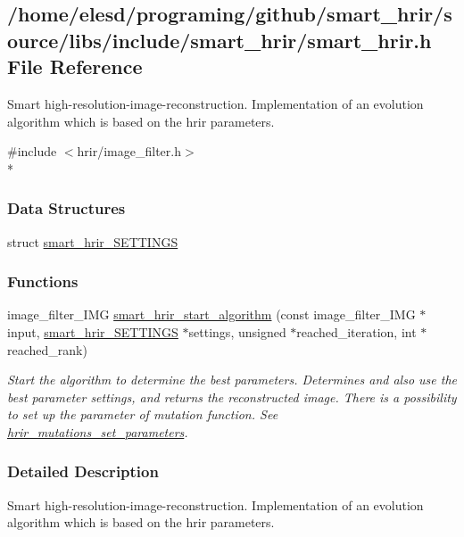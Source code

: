 \hypertarget{a00006}{\subsection{/home/elesd/programing/github/smart\-\_\-hrir/source/libs/include/smart\-\_\-hrir/smart\-\_\-hrir.h File Reference}
\label{a00006}
}


Smart high-\/resolution-\/image-\/reconstruction. Implementation of an evolution algorithm which is based on the hrir parameters.  


{\ttfamily \#include $<$hrir/image\-\_\-filter.\-h$>$}\\*
\subsubsection*{Data Structures}
\begin{DoxyCompactItemize}
\item 
struct \hyperlink{a00002}{smart\-\_\-hrir\-\_\-\-S\-E\-T\-T\-I\-N\-G\-S}
\end{DoxyCompactItemize}
\subsubsection*{Functions}
\begin{DoxyCompactItemize}
\item 
image\-\_\-filter\-\_\-\-I\-M\-G \hyperlink{a00006_a65e756585dabd3f6479eab5e6d0b8731}{smart\-\_\-hrir\-\_\-start\-\_\-algorithm} (const image\-\_\-filter\-\_\-\-I\-M\-G $\ast$input, \hyperlink{a00002}{smart\-\_\-hrir\-\_\-\-S\-E\-T\-T\-I\-N\-G\-S} $\ast$settings, unsigned $\ast$reached\-\_\-iteration, int $\ast$reached\-\_\-rank)
\begin{DoxyCompactList}\small\item\em Start the algorithm to determine the best parameters. Determines and also use the best parameter settings, and returns the reconstructed image. There is a possibility to set up the parameter of mutation function. See \hyperlink{a00005_ac26fc6e9ac49a6a0a69537b0b0d0ae82}{hrir\-\_\-mutations\-\_\-set\-\_\-parameters}. \end{DoxyCompactList}\end{DoxyCompactItemize}


\subsubsection{Detailed Description}
Smart high-\/resolution-\/image-\/reconstruction. Implementation of an evolution algorithm which is based on the hrir parameters. 

